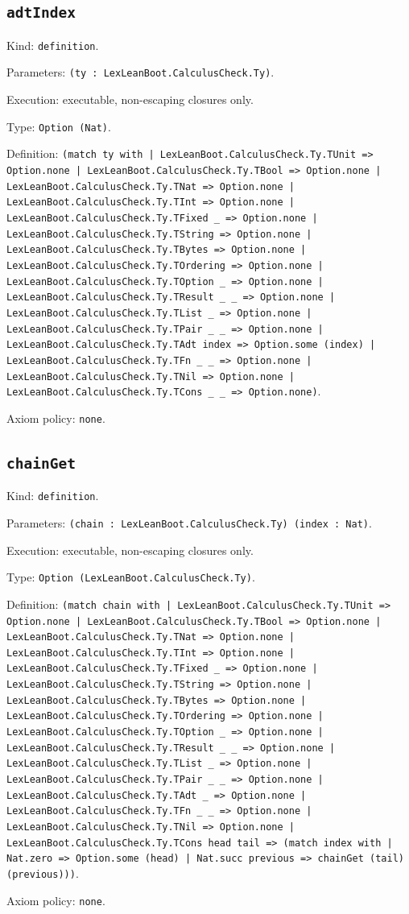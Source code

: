 \documentclass[11pt]{article}
\begin{document}
\subsection*{\texttt{adtIndex}}
\noindent Kind: \texttt{definition}.\par
\noindent Parameters: \texttt{(ty : LexLeanBoot.CalculusCheck.Ty)}.\par
\noindent Execution: executable, non-escaping closures only.\par
\noindent Type: \texttt{Option (Nat)}.\par
\noindent Definition: \texttt{(match ty with | LexLeanBoot.CalculusCheck.Ty.TUnit => Option.none | LexLeanBoot.CalculusCheck.Ty.TBool => Option.none | LexLeanBoot.CalculusCheck.Ty.TNat => Option.none | LexLeanBoot.CalculusCheck.Ty.TInt => Option.none | LexLeanBoot.CalculusCheck.Ty.TFixed \_ => Option.none | LexLeanBoot.CalculusCheck.Ty.TString => Option.none | LexLeanBoot.CalculusCheck.Ty.TBytes => Option.none | LexLeanBoot.CalculusCheck.Ty.TOrdering => Option.none | LexLeanBoot.CalculusCheck.Ty.TOption \_ => Option.none | LexLeanBoot.CalculusCheck.Ty.TResult \_ \_ => Option.none | LexLeanBoot.CalculusCheck.Ty.TList \_ => Option.none | LexLeanBoot.CalculusCheck.Ty.TPair \_ \_ => Option.none | LexLeanBoot.CalculusCheck.Ty.TAdt index => Option.some (index) | LexLeanBoot.CalculusCheck.Ty.TFn \_ \_ => Option.none | LexLeanBoot.CalculusCheck.Ty.TNil => Option.none | LexLeanBoot.CalculusCheck.Ty.TCons \_ \_ => Option.none)}.\par
\noindent Axiom policy: \texttt{none}.\par
\subsection*{\texttt{chainGet}}
\noindent Kind: \texttt{definition}.\par
\noindent Parameters: \texttt{(chain : LexLeanBoot.CalculusCheck.Ty) (index : Nat)}.\par
\noindent Execution: executable, non-escaping closures only.\par
\noindent Type: \texttt{Option (LexLeanBoot.CalculusCheck.Ty)}.\par
\noindent Definition: \texttt{(match chain with | LexLeanBoot.CalculusCheck.Ty.TUnit => Option.none | LexLeanBoot.CalculusCheck.Ty.TBool => Option.none | LexLeanBoot.CalculusCheck.Ty.TNat => Option.none | LexLeanBoot.CalculusCheck.Ty.TInt => Option.none | LexLeanBoot.CalculusCheck.Ty.TFixed \_ => Option.none | LexLeanBoot.CalculusCheck.Ty.TString => Option.none | LexLeanBoot.CalculusCheck.Ty.TBytes => Option.none | LexLeanBoot.CalculusCheck.Ty.TOrdering => Option.none | LexLeanBoot.CalculusCheck.Ty.TOption \_ => Option.none | LexLeanBoot.CalculusCheck.Ty.TResult \_ \_ => Option.none | LexLeanBoot.CalculusCheck.Ty.TList \_ => Option.none | LexLeanBoot.CalculusCheck.Ty.TPair \_ \_ => Option.none | LexLeanBoot.CalculusCheck.Ty.TAdt \_ => Option.none | LexLeanBoot.CalculusCheck.Ty.TFn \_ \_ => Option.none | LexLeanBoot.CalculusCheck.Ty.TNil => Option.none | LexLeanBoot.CalculusCheck.Ty.TCons head tail => (match index with | Nat.zero => Option.some (head) | Nat.succ previous => chainGet (tail) (previous)))}.\par
\noindent Axiom policy: \texttt{none}.\par
\end{document}
